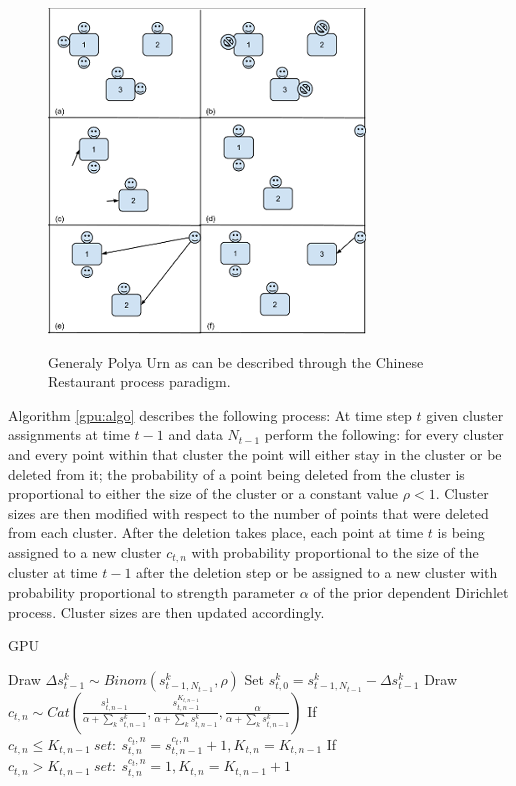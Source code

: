 \documentclass [twoside,hidelinks]{article}
\begin{document}
\begin{figure}
    \includegraphics [width=.53\textwidth]{generalPolya2}
    \label{generalPolya}
    \caption{Generaly Polya Urn as can be described through the Chinese Restaurant process paradigm.}
\end{figure}


Algorithm \ref{gpu:algo} describes the following process: At time step $t$ given cluster assignments at time $t-1$ and data $N_{t-1}$ perform the following: for every cluster and every point within that cluster the point will either stay in the cluster or be deleted from it; the probability of a point being deleted from the cluster is proportional to either the size of the cluster or a constant value $\rho <1$\cite{caron}. Cluster sizes are then modified with respect to the number of points that were deleted from each cluster. After the deletion takes place, each point at time $t$ is being assigned to a new cluster $c_{t,n}$  with probability proportional to the size of the cluster at time $t-1$ after the deletion step or be assigned to a new cluster with probability proportional to strength parameter $\alpha$ of the prior dependent Dirichlet process. Cluster sizes are then updated accordingly.

\begin{algorithm}
  \caption{GPU}\label{GPU}
  \begin{algorithmic} [1]

	      \State Draw $\Delta s_{t-1}^k \sim Binom (s_{t-1,N_{t-1}}^k, \rho) $ 
	      \State Set $s_{t,0}^{k} = s_{t-1,N_{t-1}}^{k} -\Delta s_{t-1}^k$
      \EndFor
      	    \State Draw $c_{t,n} \sim Cat ( \frac{ s_{t,n-1}^{1} }{\alpha + \sum_k s_{t,n-1}^{k} }, \frac{ s_{t,n-1}^{K_{t,n-1}} }{\alpha + \sum_k s_{t,n-1}^{k} } , \frac{ \alpha}{\alpha + \sum_k s_{t,n-1}^{k} }) $
      	    \State If $c_{t,n} \leq K_{t,n-1}\ set:\ s_{t,n}^{c_t,n} = s_{t,n-1}^{c_t,n} + 1 , K_{t,n} = K_{t,n-1}$
      	    \State If $c_{t,n} > K_{t,n-1}\ set:\ s_{t,n}^{c_t,n} = 1 , K_{t,n} = K_{t,n-1} + 1$
      \EndFor
    \EndProcedure
  \end{algorithmic}
  \label{gpu:algo}
\end{algorithm}
\end{document}
